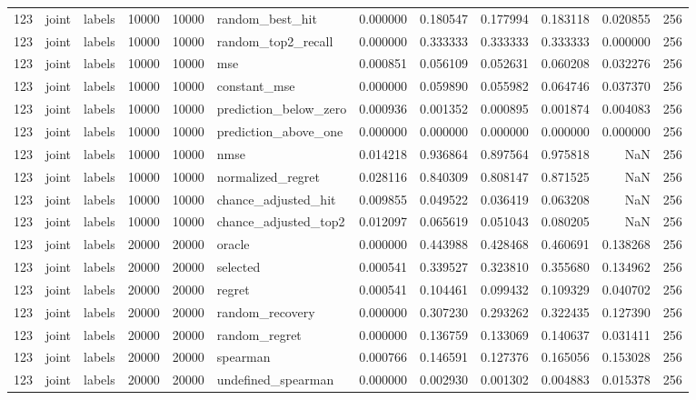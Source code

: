 \begin{tabular}{rllrrlrrrrrr}
123 & joint & labels & 10000 & 10000 & random_best_hit & 0.000000 & 0.180547 & 0.177994 & 0.183118 & 0.020855 & 256 \\
123 & joint & labels & 10000 & 10000 & random_top2_recall & 0.000000 & 0.333333 & 0.333333 & 0.333333 & 0.000000 & 256 \\
123 & joint & labels & 10000 & 10000 & mse & 0.000851 & 0.056109 & 0.052631 & 0.060208 & 0.032276 & 256 \\
123 & joint & labels & 10000 & 10000 & constant_mse & 0.000000 & 0.059890 & 0.055982 & 0.064746 & 0.037370 & 256 \\
123 & joint & labels & 10000 & 10000 & prediction_below_zero & 0.000936 & 0.001352 & 0.000895 & 0.001874 & 0.004083 & 256 \\
123 & joint & labels & 10000 & 10000 & prediction_above_one & 0.000000 & 0.000000 & 0.000000 & 0.000000 & 0.000000 & 256 \\
123 & joint & labels & 10000 & 10000 & nmse & 0.014218 & 0.936864 & 0.897564 & 0.975818 & NaN & 256 \\
123 & joint & labels & 10000 & 10000 & normalized_regret & 0.028116 & 0.840309 & 0.808147 & 0.871525 & NaN & 256 \\
123 & joint & labels & 10000 & 10000 & chance_adjusted_hit & 0.009855 & 0.049522 & 0.036419 & 0.063208 & NaN & 256 \\
123 & joint & labels & 10000 & 10000 & chance_adjusted_top2 & 0.012097 & 0.065619 & 0.051043 & 0.080205 & NaN & 256 \\
123 & joint & labels & 20000 & 20000 & oracle & 0.000000 & 0.443988 & 0.428468 & 0.460691 & 0.138268 & 256 \\
123 & joint & labels & 20000 & 20000 & selected & 0.000541 & 0.339527 & 0.323810 & 0.355680 & 0.134962 & 256 \\
123 & joint & labels & 20000 & 20000 & regret & 0.000541 & 0.104461 & 0.099432 & 0.109329 & 0.040702 & 256 \\
123 & joint & labels & 20000 & 20000 & random_recovery & 0.000000 & 0.307230 & 0.293262 & 0.322435 & 0.127390 & 256 \\
123 & joint & labels & 20000 & 20000 & random_regret & 0.000000 & 0.136759 & 0.133069 & 0.140637 & 0.031411 & 256 \\
123 & joint & labels & 20000 & 20000 & spearman & 0.000766 & 0.146591 & 0.127376 & 0.165056 & 0.153028 & 256 \\
123 & joint & labels & 20000 & 20000 & undefined_spearman & 0.000000 & 0.002930 & 0.001302 & 0.004883 & 0.015378 & 256 \\

\end{tabular}
